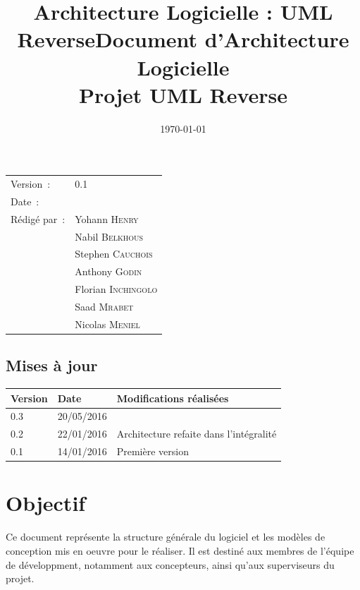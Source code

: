 \documentclass[a4paper,10pt]{article}
\title{Architecture Logicielle : UML Reverse}
\title{\bfseries Document d’Architecture Logicielle \\Projet UML Reverse}
\begin{document}
\maketitle
\begin{center}
\begin{tabular}{ll}
  Version~: & 0.1\\[.5em]
  Date~: & \date{\today}\\[.5em]
  Rédigé par~:  & Yohann \textsc{Henry}\\
		& Nabil \textsc{Belkhous}\\
		& Stephen \textsc{Cauchois}\\
		& Anthony \textsc{Godin}\\
		& Florian \textsc{Inchingolo}\\
		& Saad \textsc{Mrabet}\\
		& Nicolas \textsc{Meniel}\\
\end{tabular}
\end{center}

\newpage
\begin{center}
    \section*{Mises à jour}
    \begin{tabular}{|l|l|p{8cm}|}
        \hline{\textbf{Version}} & {\textbf{Date}} & {\textbf{Modifications réalisées}}\\\hline
        {0.3} & {20/05/2016} & {}\\\hline
        {0.2} & {22/01/2016} & {Architecture refaite dans l'intégralité}\\\hline
        {0.1} & {14/01/2016} & {Première version}\\\hline
    \end{tabular}
\end{center}

\newpage
\tableofcontents
\newpage


\section{Objectif}
Ce document représente la structure générale du logiciel et les modèles de conception mis en oeuvre pour le réaliser.
Il est destiné aux membres de l'équipe de développment, notamment aux concepteurs, ainsi qu'aux superviseurs du projet.
\end{document}
